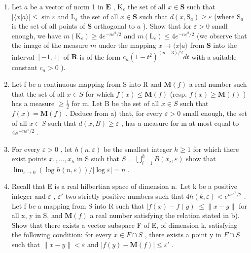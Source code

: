\begin{enumerate}
\def\labelenumi{\alph{enumi})}
\item
  Let \(a\) be a vector of norm 1 in \(\mathbf{E}\) , \(\mathrm{K}_{\varepsilon}\) the set of all \(x \in \mathbf{S}\) such that \(|\langle x|a\rangle| \leqslant \sin \varepsilon\) and \(\mathrm{L}_{\varepsilon}\) the set of all \(x \in \mathbf{S}\) such that \(d(x, \mathrm{S}_a) \geqslant \varepsilon\) (where \(\mathrm{S}_a\) is the set of all points of \(\mathbf{S}\) orthogonal to \(a\) ). Show that for \(\varepsilon > 0\) small enough, we have \(m(\mathrm{K}_{\varepsilon}) \geqslant 4e^{-n\varepsilon^2 / 2}\) and \(m(\mathrm{L}_{\varepsilon}) \leqslant 4e^{-n\varepsilon^2 / 2}\) (we observe that the image of the measure \(m\) under the mapping \(x \mapsto \langle x|a\rangle\) from \(\mathbf{S}\) into the interval \([-1, 1]\) of \(\mathbf{R}\) is of the form \(c_n(1 - t^2)^{(n-3)/2}dt\) with a suitable constant \(c_n > 0\) ).
\item
  Let f be a continuous mapping from S into R and \(\mathbf{M}(f)\) a real number such that the set of all \(x \in S\) for which \(f(x) \leqslant \mathbf{M}(f)\) (resp. \(f(x) \geqslant \mathbf{M}(f)\) ) has a measure \(\geqslant \frac{1}{2}\) for m. Let B be the set of all \(x \in S\) such that \(f(x) = \mathbf{M}(f)\) . Deduce from a) that, for every \(\varepsilon > 0\) small enough, the set of all \(x \in S\) such that \(d(x, B) \geqslant \varepsilon\) , has a measure for m at most equal to \(4e^{-n\varepsilon^{2}/2}\) .
\item
  For every \(\varepsilon > 0\) , let \(h(n, \varepsilon)\) be the smallest integer \(h \geqslant 1\) for which there exist points \(x_1, \ldots, x_h\) in S such that \(S = \bigcup_{i=1}^{h} B(x_i, \varepsilon)\) show that \(\lim_{\varepsilon \to 0} (\log h(n, \varepsilon)) / |\log \varepsilon| = n\) .
\item
  Recall that E is a real hilbertian space of dimension n.~Let k be a positive integer and \(\varepsilon\) , \(\varepsilon'\) two strictly positive numbers such that \(4h(k, \varepsilon) < e^{n\varepsilon'^{2}/2}\) . Let f be a mapping from S into R such that \(|f(x) - f(y)| \leqslant \|x - y\|\) for all x, y in S, and \(\mathbf{M}(f)\) a real number satisfying the relation stated in b). Show that there exists a vector subspace F of E, of dimension k, satisfying the following condition: for every \(x \in F \cap S\) , there exists a point y in \(F \cap S\) such that \(\|x - y\| < \varepsilon\) and \(|f(y) - \mathbf{M}(f)| \leqslant \varepsilon'\) .
\end{enumerate}

